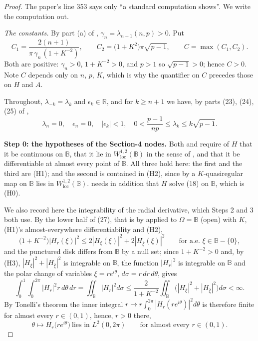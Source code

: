 \begin{proof}
The paper's line 353 says only ``a standard computation shows''.  We write the
computation out.

\emph{The constants.}  By part (a) of ,
$\gamma_n=\lambda_{n+1}(n,p)>0$.  Put
\[
  C_1=\frac{2(n+1)}{\pi\,\gamma_n\,(1+K^{-2})},\qquad
  C_2=\bigl(1+K^2\bigr)\pi\sqrt{p-1},\qquad C=\max(C_1,C_2).
\]
Both are positive: $\gamma_n>0$, $1+K^{-2}>0$, and $p>1$ so
$\sqrt{p-1}>0$; hence $C>0$.  Note $C$ depends only on $n$, $p$, $K$, which is
why the quantifier on $C$ precedes those on $H$ and $A$.

Throughout, $\lambda_{-k}=\lambda_k$ and $\epsilon_k\in\mathbb{R}$, and for
$k\ge n+1$ we have, by parts (23), (24), (25) of
,
\begin{equation}\tag{$\ast$}
  \lambda_n=0,\quad\epsilon_n=0,\quad|\epsilon_k|<1,\quad
  0<\frac{p-1}{np}\le\lambda_k\le k\sqrt{p-1}.
\end{equation}

\medskip\noindent\textbf{Step 0: the hypotheses of the Section-4 nodes.}
Both  and  require of
$H$ that it be continuous on $\mathbb{B}$, that it lie in
$W^{1,2}_{\mathrm{loc}}(\mathbb{B})$ in the sense of , and
that it be differentiable at almost every point of $\mathbb{B}$.  All three
hold here: the first and the third are (H1); and the second is contained in
(H2), since by  a $K$-quasiregular map on $\mathbb{B}$
lies in $W^{1,2}_{\mathrm{loc}}(\mathbb{B})$.   needs
in addition that $H$ solve (18) on $\mathbb{B}$, which is (H0).

We also record here the integrability of the radial derivative, which Steps 2
and 3 both use.  By the lower half of (27), that is by
 applied to $\Omega=\mathbb{B}$ (open) with $K$,
(H1)'s almost-everywhere differentiability and (H2),
\begin{equation}\tag{F0}
  \bigl(1+K^{-2}\bigr)\bigl|H_r(\xi)\bigr|^2\le2|H_\xi(\xi)|^2+2|H_{\bar\xi}(\xi)|^2
  \qquad\text{for a.e. }\xi\in\mathbb{B}-\{0\},
\end{equation}
and the punctured disk differs from $\mathbb{B}$ by a null set; since
$1+K^{-2}>0$ and, by (H3), $|H_\xi|^2+|H_{\bar\xi}|^2$ is integrable on
$\mathbb{B}$, the function $|H_r|^2$ is integrable on $\mathbb{B}$ and the
polar change of variables $\xi=re^{i\theta}$, $d\sigma=r\,dr\,d\theta$, gives
\begin{equation}\tag{F0$'$}
  \int_0^1\!\!\int_0^{2\pi}\bigl|H_r\bigr|^2r\,d\theta\,dr
  =\iint_{\mathbb{B}}|H_r|^2d\sigma
  \le\frac{2}{1+K^{-2}}\iint_{\mathbb{B}}
    \bigl(|H_\xi|^2+|H_{\bar\xi}|^2\bigr)d\sigma<\infty .
\end{equation}
By Tonelli's theorem the inner integral
$r\mapsto r\int_0^{2\pi}|H_r(re^{i\theta})|^2d\theta$ is therefore finite for
almost every $r\in(0,1)$, hence, $r>0$ there,
\begin{equation}\tag{F0$''$}
  \theta\mapsto H_r\bigl(re^{i\theta}\bigr)\ \text{lies in }L^2(0,2\pi)
  \qquad\text{for almost every }r\in(0,1).
\end{equation}


\end{proof}
